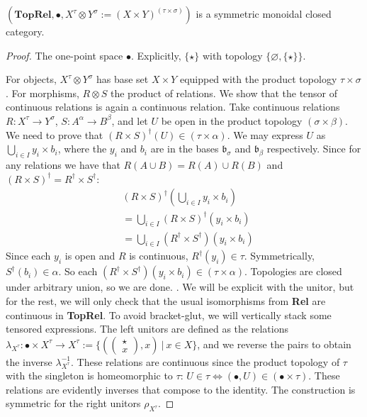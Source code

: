 \begin{proposition}
$(\mathbf{TopRel},\bullet,X^\tau \otimes Y^\sigma := (X \times Y)^{(\tau \times \sigma)})$ is a symmetric monoidal closed category.
\begin{proof}

 The one-point space $\bullet$. Explicitly, $\{\star\}$ with topology $\{\varnothing,\{\star\}\}$.


 For objects, $X^\tau \otimes Y^\sigma$ has base set $X \times Y$ equipped with the product topology $\tau \times \sigma$. For morphisms, $R \otimes S$ the product of relations. We show that the tensor of continuous relations is again a continuous relation. Take continuous relations $R: X^\tau \rightarrow Y^\sigma$, $S: A^\alpha \rightarrow B^\beta$, and let $U$ be open in the product topology $(\sigma \times \beta)$. We need to prove that $(R \times S)^\dag(U) \in (\tau \times \alpha)$. We may express $U$ as $\bigcup\limits_{i \in I} y_i \times b_i$, where the $y_i$ and $b_i$ are in the bases $\mathfrak{b}_\sigma$ and $\mathfrak{b}_\beta$ respectively. Since for any relations we have that $R(A \cup B) = R(A) \cup R(B)$ and $(R \times S)^\dag = R^\dag \times S^\dag$:
\begin{align*}
&(R \times S)^\dag(\bigcup\limits_{i \in I} y_i \times b_i)\\
 &= \bigcup\limits_{i \in I}(R \times S)^\dag(y_i \times b_i)\\
 &= \bigcup\limits_{i \in I}(R^\dag \times S^\dag)(y_i \times b_i)
 \end{align*}
Since each $y_i$ is open and $R$ is continuous, $R^\dag(y_i) \in \tau$. Symmetrically, $S^\dag(b_i) \in \alpha$. So each $(R^\dag \times S^\dag)(y_i \times b_i) \in (\tau \times \alpha)$. Topologies are closed under arbitrary union, so we are done.
. We will be explicit with the unitor, but for the rest, we will only check that the usual isomorphisms from \textbf{Rel} are continuous in \textbf{TopRel}. To avoid bracket-glut, we will vertically stack some tensored expressions.
 The left unitors are defined as the relations $\lambda_{X^{\tau}}: \bullet \times X^\tau \rightarrow X^\tau := \{(\begin{pmatrix}\star \\x \end{pmatrix}, x) \ | \ x \in X\}$, and we reverse the pairs to obtain the inverse $\lambda^{-1}_{X^{\tau}}$. These relations are continuous since the product topology of $\tau$ with the singleton is homeomorphic to $\tau$: $U \in \tau \iff (\bullet,U) \in (\bullet \times \tau)$. These relations are evidently inverses that compose to the identity. The construction is symmetric for the right unitors $\rho_{X^{\tau}}$.

\end{proof}
\end{proposition}
